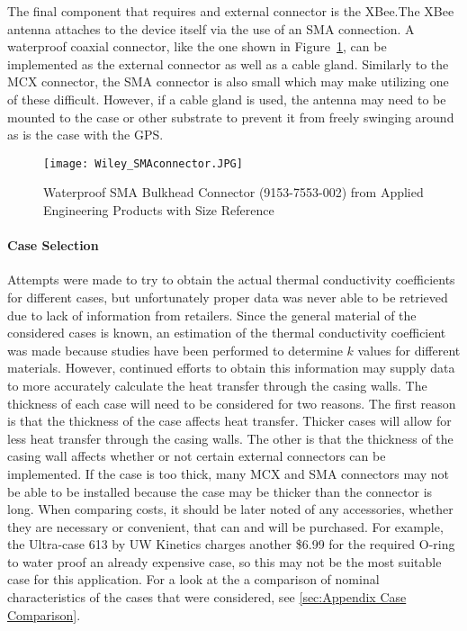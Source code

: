The final component that requires and external connector is the XBee.The XBee antenna attaches to the device itself via the use of an SMA connection.  A
waterproof coaxial connector, like the one shown in Figure~\ref{fig:SMA}, can be implemented as the external connector as well as a cable gland. 
Similarly to the MCX connector, the SMA connector is also small which may make utilizing one of these difficult.  However, if a cable gland is used, the
antenna may need to be mounted to the case or other substrate to prevent it from freely swinging around as is the case with the GPS.
\begin{figure}[ht]
\centering
\texttt{[image: Wiley\_SMAconnector.JPG]}
\caption{\label{fig:SMA} Waterproof SMA Bulkhead Connector (9153-7553-002) from Applied Engineering Products with Size Reference}
\end{figure}



\paragraph {Case Selection} Attempts were made to try to obtain the actual thermal conductivity coefficients for different cases, but unfortunately proper
data was never able to be retrieved due to lack of information from retailers.  Since the general material of the considered cases is known, an
estimation of the thermal conductivity coefficient was made because studies have been performed to determine $k$ values for different materials. 
However, continued efforts to obtain this information may supply data to more accurately calculate the heat transfer through the casing walls.  The
thickness of each case will need to be considered for two reasons.  The first reason is that the thickness of the case affects heat transfer.  Thicker
cases will allow for less heat transfer through the casing walls.  The other is that the thickness of the casing wall affects whether or not certain
external connectors can be implemented.  If the case is too thick, many MCX and SMA connectors may not be able to be installed because the case may
be thicker than the connector is long.  When comparing costs, it should be later noted of any accessories, whether they are necessary or
convenient, that can and will be purchased.  For example, the Ultra-case 613 by UW Kinetics charges another \$6.99 for the required O-ring to
water proof an already expensive case, so this may not be the most suitable case for this application.  For a look at the a comparison of nominal
characteristics of the cases that were considered, see \ref{sec:Appendix Case Comparison}.

